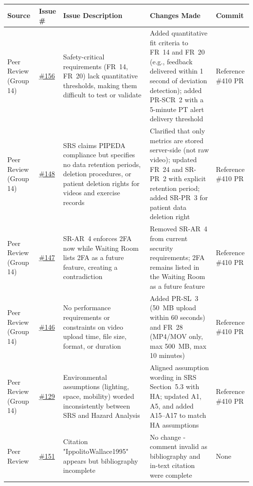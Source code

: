 \documentclass{article}
\begin{document}
{\small
\begin{xltabular}{\textwidth}{>{\raggedright\arraybackslash}X >{\raggedright\arraybackslash}p{0.8cm} >{\raggedright\arraybackslash}X >{\raggedright\arraybackslash}X >{\raggedright\arraybackslash}p{2.0cm}}
\toprule
\textbf{Source} & \textbf{Issue \#} & \textbf{Issue Description} & \textbf{Changes Made} & \textbf{Commit} \\
\midrule
Peer Review (Group 14) & \href{https://github.com/M9Huynh/technically-functional/issues/156}{\#156} & Safety-critical requirements (FR~14, FR~20) lack quantitative thresholds, making them difficult to test or validate & Added quantitative fit criteria to FR~14 and FR~20 (e.g., feedback delivered within 1 second of deviation detection); added PR-SCR~2 with a 5-minute PT alert delivery threshold & Reference \#410 PR \\
\midrule
Peer Review (Group 14) & \href{https://github.com/M9Huynh/technically-functional/issues/148}{\#148} & SRS claims PIPEDA compliance but specifies no data retention periods, deletion procedures, or patient deletion rights for videos and exercise records & Clarified that only metrics are stored server-side (not raw video); updated FR~24 and SR-PR~2 with explicit retention period; added SR-PR~3 for patient data deletion right & Reference \#410 PR \\
\midrule
Peer Review (Group 14) & \href{https://github.com/M9Huynh/technically-functional/issues/147}{\#147} & SR-AR~4 enforces 2FA now while Waiting Room lists 2FA as a future feature, creating a contradiction & Removed SR-AR~4 from current security requirements; 2FA remains listed in the Waiting Room as a future feature & Reference \#410 PR \\
\midrule
Peer Review (Group 14) & \href{https://github.com/M9Huynh/technically-functional/issues/146}{\#146} & No performance requirements or constraints on video upload time, file size, format, or duration & Added PR-SL~3 (50~MB upload within 60 seconds) and FR~28 (MP4/MOV only, max 500~MB, max 10 minutes) & Reference \#410 PR \\
\midrule
Peer Review (Group 14) & \href{https://github.com/M9Huynh/technically-functional/issues/129}{\#129} & Environmental assumptions (lighting, space, mobility) worded inconsistently between SRS and Hazard Analysis & Aligned assumption wording in SRS Section~5.3 with HA; updated A1, A5, and added A15--A17 to match HA assumptions & Reference \#410 PR \\
\midrule
Peer Review & \href{https://github.com/M9Huynh/technically-functional/issues/151}{\#151} & Citation "IppolitoWallace1995" appears but bibliography incomplete & No change - comment invalid as bibliography and in-text citation were complete & None \\

\end{xltabular}}
\end{document}
